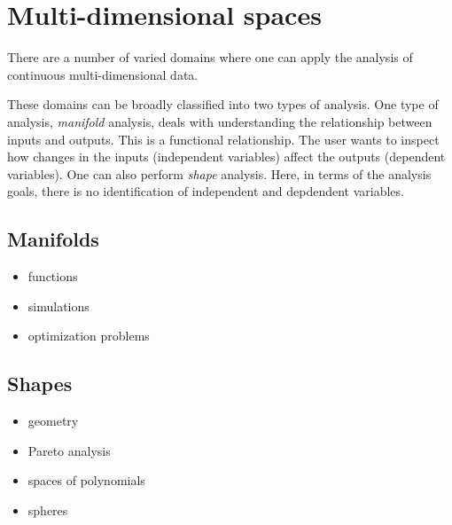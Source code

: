 \section{Multi-dimensional spaces}
\label{multi-dimensional-spaces}

There are a number of varied domains where one can apply the analysis of
continuous multi-dimensional data.



These domains can be broadly classified into two types of analysis.  One type
of analysis, \emph{manifold} analysis, deals with understanding the
relationship between inputs and outputs. This is a functional relationship.
The user wants to inspect how changes in the inputs (independent variables)
affect the outputs (dependent variables). One can also perform \emph{shape}
analysis. Here, in terms of the analysis goals, there is no identification of 
independent and depdendent variables. 


\subsection{Manifolds}
\label{sec:manifolds}

    \begin{itemize}
    \item
      functions
    \item
      simulations
    \item
      optimization problems
    \end{itemize}

\subsection{Shapes}
\label{sec:shapes}

    \begin{itemize}
    \item
      geometry
    \item
      Pareto analysis
    \item
      spaces of polynomials
    \item
      spheres
    \end{itemize}

